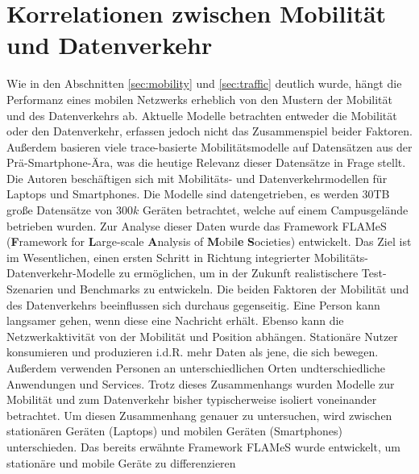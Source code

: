 \documentclass[12pt, a4paper]{article}
\begin{document}
\vfill

\pagebreak

\section{Korrelationen zwischen Mobilität und Datenverkehr}

Wie in den Abschnitten \ref{sec:mobility} und \ref{sec:traffic} deutlich wurde, hängt die Performanz eines mobilen
Netzwerks erheblich von den Mustern der Mobilität und des Datenverkehrs ab.
\newline\newline
Aktuelle Modelle betrachten entweder die Mobilität oder den Datenverkehr, erfassen jedoch nicht das Zusammenspiel beider Faktoren.
\cite{Alipour2018} Außerdem basieren viele trace-basierte Mobilitätsmodelle auf Datensätzen aus der Prä-Smartphone-Ära,
was die heutige Relevanz dieser Datensätze in Frage stellt. Die Autoren beschäftigen sich mit Mobilitäts- und Datenverkehrmodellen
für Laptops und Smartphones.
\newline\newline
Die Modelle sind datengetrieben, es werden $30$\textsc{TB} große Datensätze von $300 k$ Geräten betrachtet, welche auf einem Campusgelände
betrieben wurden. Zur Analyse dieser Daten wurde das Framework FLAMeS (\textbf{F}ramework for \textbf{L}arge-scale \textbf{A}nalysis of \textbf{M}obil\textbf{e} \textbf{S}ocieties) entwickelt. Das Ziel ist im Wesentlichen, einen ersten Schritt in Richtung integrierter
Mobilitäts-Datenverkehr-Modelle zu ermöglichen, um in der Zukunft realistischere Test-Szenarien und Benchmarks zu entwickeln.
\newline\newline
Die beiden Faktoren der Mobilität und des Datenverkehrs beeinflussen sich durchaus gegenseitig. Eine Person kann langsamer gehen,
wenn diese eine Nachricht erhält. Ebenso kann die Netzwerkaktivität von der Mobilität und Position abhängen. Stationäre Nutzer
konsumieren und produzieren i.d.R. mehr Daten als jene, die sich bewegen. Außerdem verwenden Personen an unterschiedlichen
Orten undterschiedliche Anwendungen und Services. Trotz dieses Zusammenhangs wurden Modelle zur Mobilität und zum Datenverkehr
bisher typischerweise isoliert voneinander betrachtet.
\newline\newline
Um diesen Zusammenhang genauer zu untersuchen, wird zwischen stationären Geräten (Laptops) und mobilen Geräten (Smartphones)
unterschieden. Das bereits erwähnte Framework FLAMeS wurde entwickelt, um stationäre und mobile Geräte zu differenzieren
\end{document}
